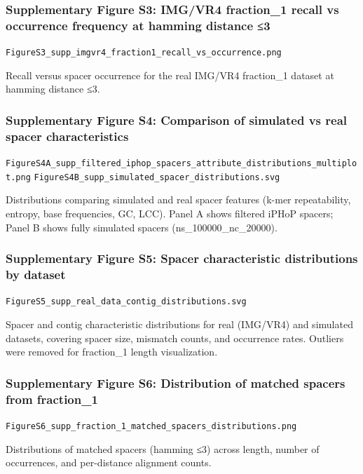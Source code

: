 \documentclass[
]{article}
\begin{document}
\subsubsection{Supplementary Figure S3: IMG/VR4 fraction\_1 recall vs
occurrence frequency at hamming distance ≤3}\label{fig-supp-real-recall}

\texttt{FigureS3\_supp\_imgvr4\_fraction1\_recall\_vs\_occurrence.png}

Recall versus spacer occurrence for the real IMG/VR4 fraction\_1 dataset
at hamming distance ≤3.

\subsubsection{Supplementary Figure S4: Comparison of simulated vs real
spacer characteristics}\label{fig-supp-spacer-comparison}

\texttt{FigureS4A\_supp\_filtered\_iphop\_spacers\_attribute\_distributions\_multiplot.png}
\texttt{FigureS4B\_supp\_simulated\_spacer\_distributions.svg}

Distributions comparing simulated and real spacer features (k-mer
repeatability, entropy, base frequencies, GC, LCC). Panel A shows
filtered iPHoP spacers; Panel B shows fully simulated spacers
(ns\_100000\_nc\_20000).

\subsubsection{Supplementary Figure S5: Spacer characteristic
distributions by dataset}\label{fig-supp-spacer-distributions}

\texttt{FigureS5\_supp\_real\_data\_contig\_distributions.svg}

Spacer and contig characteristic distributions for real (IMG/VR4) and
simulated datasets, covering spacer size, mismatch counts, and
occurrence rates. Outliers were removed for fraction\_1 length
visualization.

\subsubsection{Supplementary Figure S6: Distribution of matched spacers
from fraction\_1}\label{fig-supp-occurrence-distribution}

\texttt{FigureS6\_supp\_fraction\_1\_matched\_spacers\_distributions.png}

Distributions of matched spacers (hamming ≤3) across length, number of
occurrences, and per-distance alignment counts.
\end{document}
